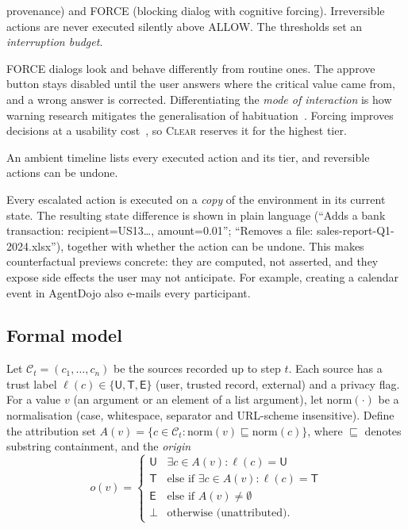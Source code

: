 \documentclass[preprint,12pt,nonatbib]{elsarticle}
\theoremstyle{remark}
\newcommand{\clear}{\textsc{Clear}}
\newcommand{\tier}[1]{\textsf{#1}}
\begin{document}
\begin{description}[leftmargin=0pt,itemsep=3pt,font=\normalfont\bfseries]
  provenance) and \tier{FORCE} (blocking dialog with cognitive forcing).
  Irreversible actions are never executed silently above \tier{ALLOW}. The
  thresholds set an \emph{interruption budget}.
\item[P5 Differentiated forcing.] \tier{FORCE} dialogs look and behave
  differently from routine ones. The approve button stays disabled until the
  user answers where the critical value came from, and a wrong answer is
  corrected. Differentiating the \emph{mode of interaction} is how warning
  research mitigates the generalisation of habituation~\citep{vance2025fog,anderson2015polymorphic}.
  Forcing improves decisions at a usability cost~\citep{bucinca2021trust}, so
  \clear{} reserves it for the highest tier.
\item[P6 Audit and undo.] An ambient timeline lists every executed action and
  its tier, and reversible actions can be undone.
\item[P7 Computed consequence preview.] Every escalated action is executed on a
  \emph{copy} of the environment in its current state. The resulting state
  difference is shown in plain language (``Adds a bank transaction:
  recipient=US13\ldots, amount=0.01''; ``Removes a file:
  sales-report-Q1-2024.xlsx''), together with whether the action can be undone.
  This makes counterfactual previews concrete: they are computed, not asserted,
  and they expose side effects the user may not anticipate. For example,
  creating a calendar event in AgentDojo also e-mails every participant.
\end{description}

\subsection{Formal model}
\label{sec:formal}

Let $\mathcal{C}_t=(c_1,\dots,c_n)$ be the sources recorded up to step $t$. Each
source has a trust label $\ell(c)\in\{\mathsf{U},\mathsf{T},\mathsf{E}\}$ (user,
trusted record, external) and a privacy flag. For a value $v$ (an argument or
an element of a list argument), let $\mathrm{norm}(\cdot)$ be a normalisation
(case, whitespace, separator and URL-scheme insensitive). Define the
attribution set $A(v)=\{c\in\mathcal{C}_t : \mathrm{norm}(v)\sqsubseteq\mathrm{norm}(c)\}$,
where $\sqsubseteq$ denotes substring containment, and the \emph{origin}
\begin{equation}
o(v)=\begin{cases}
\mathsf{U} & \exists c\in A(v): \ell(c)=\mathsf{U}\\
\mathsf{T} & \text{else if } \exists c\in A(v): \ell(c)=\mathsf{T}\\
\mathsf{E} & \text{else if } A(v)\neq\emptyset\\
\bot & \text{otherwise (unattributed).}
\end{cases}
\end{equation}
\end{document}
